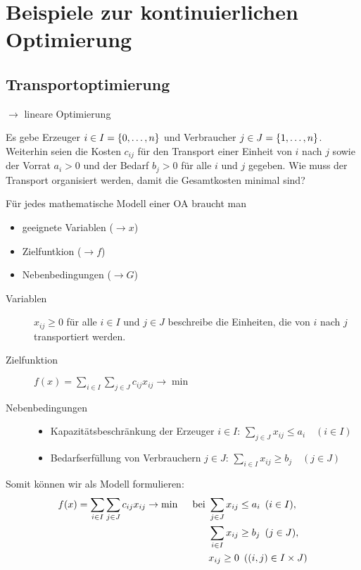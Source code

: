 \section{Beispiele zur kontinuierlichen Optimierung}

\subsection{Transportoptimierung}

$\to$ lineare Optimierung

Es gebe Erzeuger $i \in I = \left\{ 0, \dots , n \right\}$ und Verbraucher $j \in J = \left\{ 1, \dots , n \right\}$. Weiterhin seien die Kosten $c_{ij}$ für den Transport einer Einheit von $i$ nach $j$ sowie der Vorrat $a_i > 0$ und der Bedarf $b_j > 0$ für alle $i$ und $j$ gegeben. Wie muss der Transport organisiert werden, damit die Gesamtkosten minimal sind?

Für jedes mathematische Modell einer OA braucht man
\begin{itemize}[nolistsep, topsep=-\parskip]
	\item geeignete Variablen ($\to x$)
	\item Zielfuntkion ($\to f$)
	\item Nebenbedingungen ($\to G$)
\end{itemize}

\begin{description}
	\item[Variablen] $x_{ij} \ge 0$ für alle $i \in I$ und $j \in J$ beschreibe die Einheiten, die von $i$ nach $j$ transportiert werden.
	\item[Zielfunktion] $f(x) = \sum\limits_{i \in I} \sum\limits_{j \in J} c_{ij} x_{ij} \to \min$
	\item[Nebenbedingungen] \leavevmode
	\begin{itemize}[nolistsep, topsep=-\parskip]
		\item Kapazitätsbeschränkung der Erzeuger $i \in I$: $\sum\limits_{j \in J} x_{ij} \le a_i \quad (i \in I)$
		\item Bedarfserfüllung von Verbrauchern $j \in J$: $\sum\limits_{i \in I} x_{ij} \ge b_j \quad (j \in J) $
	\end{itemize}
\end{description}

Somit können wir als Modell formulieren:
\begin{equation*}
	\begin{aligned}
	f(x) = \sum_{i \in I} \sum_{j \in J} c_{ij} x_{ij} \to \min \quad \text{ bei } &\sum_{j \in J} x_{ij} \le a_i \enskip (i \in I), \\
	&\sum_{i \in I} x_{ij} \ge b_j \enskip (j \in J), \\
	& x_{ij} \ge 0 \enskip ((i,j) \in I \times J)
	\end{aligned}
\end{equation*}

